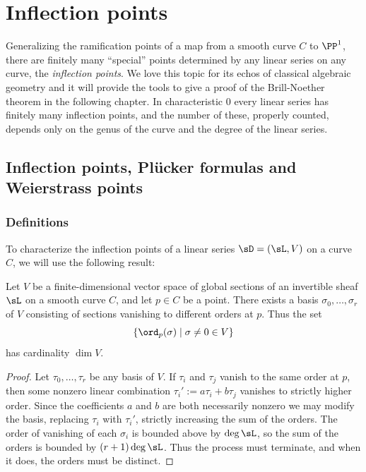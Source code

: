 

\chapter{Inflection points}\label{inflections chapter}
\label{InflectionsChapter}


Generalizing the ramification points of a map from a smooth curve $C$ to $\PP^1$, there are finitely
many ``special'' points determined by any linear series on any curve, the \emph{inflection points}.
We love this topic for its echos of classical algebraic geometry and it will provide the tools to give a proof of the Brill-Noether theorem in the following chapter. In characteristic 0 every linear series has finitely many inflection points, and the number of these, properly counted, depends only on the genus of the curve and the degree of the linear series.

\section{Inflection points,  Pl\"ucker formulas and Weierstrass points}

\subsection{Definitions}
To characterize the inflection points of a linear series $\sD = (\sL, V)$ on a curve $C$, we will use the following result:

\begin{proposition}\label{vanishing sequence} Let $V$ be a finite-dimensional vector space of global sections of an invertible sheaf $\sL$ on a smooth curve $C$, and let $p \in C$ be a point. There exists a basis $\sigma_0, \dots, \sigma_r$ of $V$ consisting of sections vanishing to different orders at $p$. Thus the set
$$
\{ \ord_p(\sigma) \mid \sigma \neq 0 \in V \}
$$
 has cardinality $\dim V$.
\end{proposition}

\begin{proof} Let $\tau_0, \dots, \tau_r$ be any basis of $V$.  If  $\tau_i$ and $\tau_j$ vanish to the same order at $p$, then 
some nonzero linear combination $\tau_i' := a\tau_i+b\tau_j$   vanishes to strictly higher order. Since the coefficients $a$ and $b$ are both necessarily nonzero we may modify the basis, replacing $\tau_i$ with $\tau_i'$, strictly increasing the sum of the orders. 
The order of vanishing of each $\sigma_i$ is bounded above by $\deg \sL$, so the sum of the orders is bounded by $(r+1)\deg \sL$. Thus the process must terminate, and when it does,
 the orders must be distinct. \end{proof}

